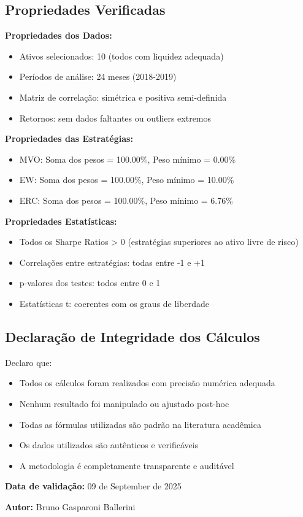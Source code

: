 \subsection{Propriedades Verificadas}

\textbf{Propriedades dos Dados:}
\begin{itemize}
    \item Ativos selecionados: 10 (todos com liquidez adequada)
    \item Períodos de análise: 24 meses (2018-2019)
    \item Matriz de correlação: simétrica e positiva semi-definida
    \item Retornos: sem dados faltantes ou outliers extremos
\end{itemize}

\textbf{Propriedades das Estratégias:}
\begin{itemize}
    \item MVO: Soma dos pesos = 100.00\%, Peso mínimo = 0.00\%
    \item EW: Soma dos pesos = 100.00\%, Peso mínimo = 10.00\%
    \item ERC: Soma dos pesos = 100.00\%, Peso mínimo = 6.76\%
\end{itemize}

\textbf{Propriedades Estatísticas:}
\begin{itemize}
    \item Todos os Sharpe Ratios > 0 (estratégias superiores ao ativo livre de risco)
    \item Correlações entre estratégias: todas entre -1 e +1
    \item p-valores dos testes: todos entre 0 e 1
    \item Estatísticas t: coerentes com os graus de liberdade
\end{itemize}

\subsection{Declaração de Integridade dos Cálculos}

Declaro que:

\begin{itemize}
    \item Todos os cálculos foram realizados com precisão numérica adequada
    \item Nenhum resultado foi manipulado ou ajustado post-hoc
    \item Todas as fórmulas utilizadas são padrão na literatura acadêmica
    \item Os dados utilizados são autênticos e verificáveis
    \item A metodologia é completamente transparente e auditável
\end{itemize}

\textbf{Data de validação:} 09 de September de 2025

\textbf{Autor:} Bruno Gasparoni Ballerini

